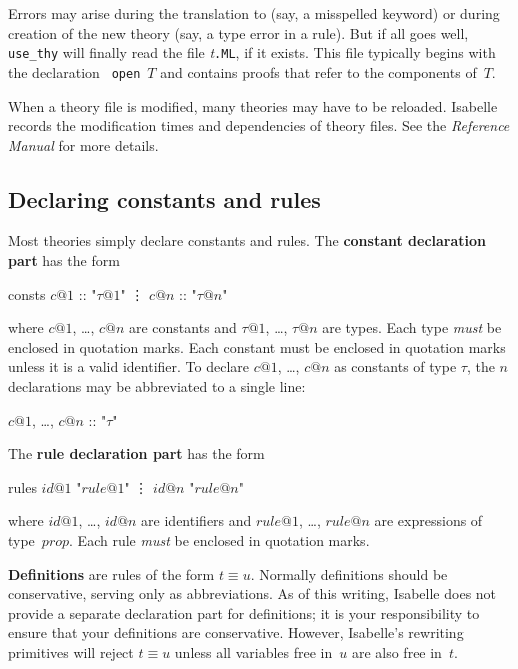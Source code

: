 Errors may arise during the translation to {\ML} (say, a misspelled keyword)
or during creation of the new theory (say, a type error in a rule).  But if
all goes well, {\tt use_thy} will finally read the file {\it t}{\tt.ML}, if
it exists.  This file typically begins with the {\ML} declaration {\tt
open}~$T$ and contains proofs that refer to the components of~$T$.

When a theory file is modified, many theories may have to be reloaded.
Isabelle records the modification times and dependencies of theory files.
See the {\em Reference Manual\/}
for more details.


\subsection{Declaring constants and rules}

Most theories simply declare constants and rules.  The {\bf constant
declaration part} has the form
\begin{ttbox}
consts  \(c@1\) :: "\(\tau@1\)"
        \vdots
        \(c@n\) :: "\(\tau@n\)"
\end{ttbox}
where $c@1$, \ldots, $c@n$ are constants and $\tau@1$, \ldots, $\tau@n$ are
types.  Each type {\em must\/} be enclosed in quotation marks.  Each
constant must be enclosed in quotation marks unless it is a valid
identifier.  To declare $c@1$, \ldots, $c@n$ as constants of type $\tau$,
the $n$ declarations may be abbreviated to a single line:
\begin{ttbox}
        \(c@1\), \ldots, \(c@n\) :: "\(\tau\)"
\end{ttbox}
The {\bf rule declaration part} has the form
\begin{ttbox}
rules   \(id@1\) "\(rule@1\)"
        \vdots
        \(id@n\) "\(rule@n\)"
\end{ttbox}
where $id@1$, \ldots, $id@n$ are \ML{} identifiers and $rule@1$, \ldots,
$rule@n$ are expressions of type~$prop$.  Each rule {\em must\/} be
enclosed in quotation marks.

{\bf Definitions} are rules of the form $t\equiv u$.  Normally definitions
should be conservative, serving only as abbreviations.  As of this writing,
Isabelle does not provide a separate declaration part for definitions; it
is your responsibility to ensure that your definitions are conservative.
However, Isabelle's rewriting primitives will reject $t\equiv u$ unless all
variables free in~$u$ are also free in~$t$.

